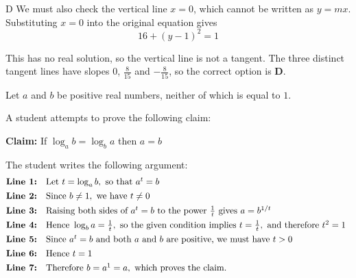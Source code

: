 \documentclass[11pt,a4paper]{article}
\begin{document}
\begin{enumerate}[label=\textbf{\arabic*.},leftmargin=*,itemsep=0pt,start=11]
\begin{djsSolution}{D}
We must also check the vertical line $x=0$, which cannot be written as $y=mx$. Substituting $x=0$ into the original equation gives
\[
16+(y-1)^2=1
\]

This has no real solution, so the vertical line is not a tangent. The three distinct tangent lines have slopes $0$, $\frac{8}{15}$ and $-\frac{8}{15}$, so the correct option is \textbf{D}.
\end{djsSolution}
\end{enumerate}
\clearpage
\thispagestyle{djssolutions}
\vspace*{8pt}
\begin{enumerate}[label=\textbf{\arabic*.},leftmargin=*,itemsep=0pt,start=12]
Let $a$ and $b$ be positive real numbers, neither of which is equal to $1$. 

A student attempts to prove the following claim:
\begin{center} \begin{minipage}{0.82\linewidth} \centering \textbf{Claim:} If  $\log_a b=\log_b a$ then $a=b$ \end{minipage} \end{center}
The student writes the following argument: \[
\begin{array}{@{}ll}
\textbf{Line 1:} & \text{Let } t=\log_a b,\text{ so that }a^t=b \\[4pt]

\textbf{Line 2:} & \text{Since }b\neq1,\text{ we have }t\neq0 \\[4pt]

\textbf{Line 3:} &
\text{Raising both sides of }a^t=b\text{ to the power }\frac1t
\text{ gives }a=b^{1/t} \\[4pt]

\textbf{Line 4:} &
\text{Hence }\log_b a=\frac1t,\text{ so the given condition implies }
t=\frac1t,\text{ and therefore }t^2=1 \\[4pt]

\textbf{Line 5:} &
\text{Since }a^t=b\text{ and both }a\text{ and }b\text{ are positive, we must have }t>0 \\[4pt]

\textbf{Line 6:} & \text{Hence }t=1 \\[4pt]

\textbf{Line 7:} & \text{Therefore }b=a^1=a,\text{ which proves the claim.}
\end{array}
\]


\end{enumerate}
\end{document}
